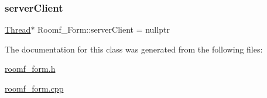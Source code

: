 \subsubsection{\texorpdfstring{server\+Client}{serverClient}}
{\footnotesize\ttfamily \mbox{\hyperlink{class_thread}{Thread}}$\ast$ Roomf\+\_\+\+Form\+::server\+Client = nullptr}



The documentation for this class was generated from the following files\+:\begin{DoxyCompactItemize}
\item 
\mbox{\hyperlink{roomf__form_8h}{roomf\+\_\+form.\+h}}\item 
\mbox{\hyperlink{roomf__form_8cpp}{roomf\+\_\+form.\+cpp}}\end{DoxyCompactItemize}
